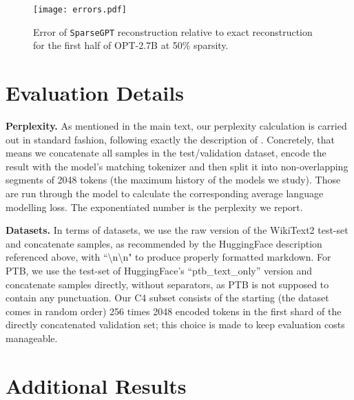 \documentclass{article}
\theoremstyle{plain}
\theoremstyle{definition}
\theoremstyle{remark}
\renewcommand{\paragraph}[1]{\vspace{-0.1em} \noindent \textbf{#1}}
\newcommand{\sparsegpt}[1]{\texttt{SparseGPT}}
\begin{document}
\begin{figure}[h!]
    \centering
    \texttt{[image: errors.pdf]}
    \vspace{-10pt}
    \caption{Error of \sparsegpt{} reconstruction relative to exact reconstruction for the first half of OPT-2.7B at 50\% sparsity.}
    \label{fig:errors}
\end{figure}

\section{Evaluation Details}
\label{app:evaluation-details}

\paragraph{Perplexity.} As mentioned in the main text, our perplexity calculation is carried out in standard fashion, following exactly the description of \cite{hfperplexity}. Concretely, that means we concatenate all samples in the test/validation dataset, encode the result with the model's matching tokenizer and then split it into non-overlapping segments of 2048 tokens (the maximum history of the models we study). Those are run through the model to calculate the corresponding average language modelling loss. The exponentiated number is the perplexity we report.

\paragraph{Datasets.} In terms of datasets, we use the raw version of the WikiText2 test-set and concatenate samples, as recommended by the HuggingFace description referenced above, with ``\textbackslash n\textbackslash n" to produce properly formatted markdown. For PTB, we use the test-set of HuggingFace's ``ptb\_text\_only'' version and concatenate samples directly, without separators, as PTB is not supposed to contain any punctuation. Our C4 subset consists of the starting (the dataset comes in random order) 256 times 2048 encoded tokens in the first shard of the directly concatenated validation set; this choice is made to keep evaluation costs manageable.

\section{Additional Results}
\label{app:additional-experiments}
\end{document}
